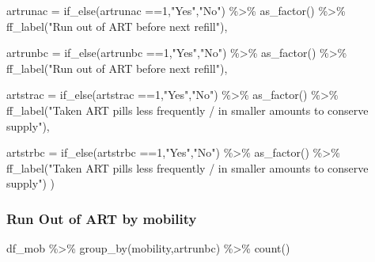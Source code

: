 \documentclass[
  letterpaper,
  DIV=11,
  numbers=noendperiod]{scrartcl}
\newenvironment{Shaded}{\begin{snugshade}}{\end{snugshade}}
\newcommand{\AttributeTok}[1]{\textcolor[rgb]{0.40,0.45,0.13}{#1}}
\newcommand{\DecValTok}[1]{\textcolor[rgb]{0.68,0.00,0.00}{#1}}
\newcommand{\FunctionTok}[1]{\textcolor[rgb]{0.28,0.35,0.67}{#1}}
\newcommand{\NormalTok}[1]{\textcolor[rgb]{0.00,0.23,0.31}{#1}}
\newcommand{\SpecialCharTok}[1]{\textcolor[rgb]{0.37,0.37,0.37}{#1}}
\newcommand{\StringTok}[1]{\textcolor[rgb]{0.13,0.47,0.30}{#1}}
\begin{document}
\begin{Shaded}
\begin{Highlighting}[]
     \AttributeTok{artrunac =} \FunctionTok{if\_else}\NormalTok{(artrunac }\SpecialCharTok{==}\DecValTok{1}\NormalTok{,}\StringTok{"Yes"}\NormalTok{,}\StringTok{"No"}\NormalTok{) }\SpecialCharTok{\%\textgreater{}\%} 
    \FunctionTok{as\_factor}\NormalTok{() }\SpecialCharTok{\%\textgreater{}\%} 
    \FunctionTok{ff\_label}\NormalTok{(}\StringTok{"Run out of ART before next refill"}\NormalTok{),}
 
   \AttributeTok{artrunbc =} \FunctionTok{if\_else}\NormalTok{(artrunbc }\SpecialCharTok{==}\DecValTok{1}\NormalTok{,}\StringTok{"Yes"}\NormalTok{,}\StringTok{"No"}\NormalTok{) }\SpecialCharTok{\%\textgreater{}\%} 
    \FunctionTok{as\_factor}\NormalTok{() }\SpecialCharTok{\%\textgreater{}\%} 
    \FunctionTok{ff\_label}\NormalTok{(}\StringTok{"Run out of ART before next refill"}\NormalTok{),}
  
  \AttributeTok{artstrac =} \FunctionTok{if\_else}\NormalTok{(artstrac }\SpecialCharTok{==}\DecValTok{1}\NormalTok{,}\StringTok{"Yes"}\NormalTok{,}\StringTok{"No"}\NormalTok{) }\SpecialCharTok{\%\textgreater{}\%} 
    \FunctionTok{as\_factor}\NormalTok{() }\SpecialCharTok{\%\textgreater{}\%} 
    \FunctionTok{ff\_label}\NormalTok{(}\StringTok{"Taken ART pills less frequently / in smaller}
\StringTok{amounts to conserve supply"}\NormalTok{),}
  
  \AttributeTok{artstrbc =} \FunctionTok{if\_else}\NormalTok{(artstrbc }\SpecialCharTok{==}\DecValTok{1}\NormalTok{,}\StringTok{"Yes"}\NormalTok{,}\StringTok{"No"}\NormalTok{) }\SpecialCharTok{\%\textgreater{}\%} 
    \FunctionTok{as\_factor}\NormalTok{() }\SpecialCharTok{\%\textgreater{}\%} 
    \FunctionTok{ff\_label}\NormalTok{(}\StringTok{"Taken ART pills less frequently / in smaller}
\StringTok{amounts to conserve supply"}\NormalTok{)}
\NormalTok{  )}
\end{Highlighting}
\end{Shaded}

\subsubsection{Run Out of ART by
mobility}\label{run-out-of-art-by-mobility}

\begin{Shaded}
\begin{Highlighting}[]
\NormalTok{df\_mob }\SpecialCharTok{\%\textgreater{}\%} \FunctionTok{group\_by}\NormalTok{(mobility,artrunbc) }\SpecialCharTok{\%\textgreater{}\%} 
  \FunctionTok{count}\NormalTok{()}
\end{Highlighting}
\end{Shaded}
\end{document}
